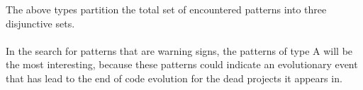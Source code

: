 \noindent
The above types partition the total set of encountered patterns into three
disjunctive sets.

\paragraph{}
In the search for patterns that are warning signs, the patterns of type A will
be the most interesting, because these patterns could indicate an evolutionary
event that has lead to the end of code evolution for the dead projects it
appears in.

\begin{comment}
- Execution of the research
- Phases, steps

This chapter reports on the execution of the research method as described in Chapter 3.

If the research has been divided into phases (e.g., using sub questions) the
phases are introduced, reported on and concluded individually. If needed this
Chapter could be split up to balance out the sizes of all Chapters.
An example Research Chapter is provided as Chapter 3 at Paul’s home
page\footnote{http://homepages.cwi.nl/~paulk/thesesMasterSoftwareEngineering/2006/ReneWiegers.pdf}.
\end{comment}
